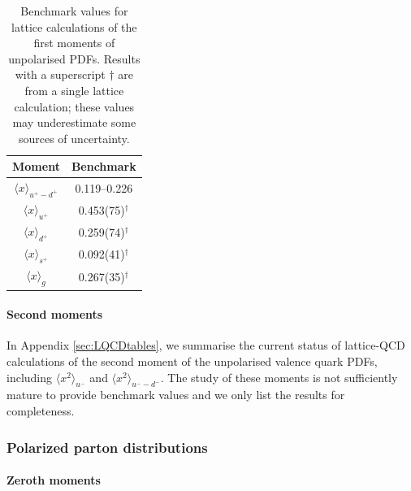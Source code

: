\begin{table}
\renewcommand{\arraystretch}{1.2} 
\centering
\begin{tabular}{cc}
\hline 
\rule[-4 ex]{0pt}{7 ex}  %
Moment & Benchmark \vspace*{-10pt}\\
\hline 
$\langle x \rangle_{u^+ -d^+}$ & \numrange{0.119}{0.226} \\
$\langle x \rangle_{u^+}$ & 0.453(75)$^\dagger$ \\
$\langle x \rangle_{d^+}$ & 0.259(74)$^\dagger$  \\
$\langle x \rangle_{s^+}$ & 0.092(41)$^\dagger$  \\
$\langle x\rangle_{g}$ & 0.267(35)$^\dagger$  \\
\hline 
\end{tabular}
\caption{Benchmark values for lattice calculations of the first moments of unpolarised PDFs. 
Results with a superscript $\dagger$ are from a single lattice calculation; these values may underestimate some sources of uncertainty.}
\label{tab:LQCDunpol}
\end{table}

\paragraph{Second moments}
In Appendix \ref{sec:LQCDtables}, we summarise the current status of lattice-QCD calculations of the second moment of 
the unpolarised valence quark PDFs, including $\langle x^2 \rangle_{u^-}$ and $\langle x^2\rangle_{u^--d^-}$. 
The study of these moments is not sufficiently mature to provide benchmark values and we only list the results for completeness.

\subsubsection{Polarized parton distributions}

\paragraph{Zeroth moments}

